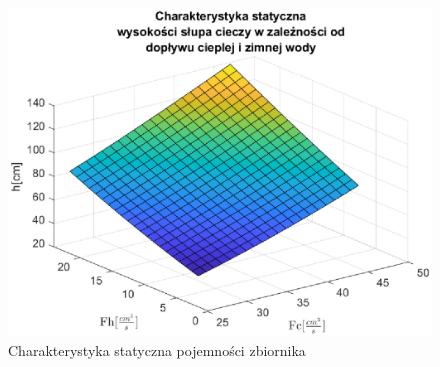 \begin{figure}[h!]
   \centering
   \includegraphics{img/static/staticV.eps}
   \caption{Charakterystyka statyczna pojemności zbiornika}
   \label{fig:staticV}
\end{figure}
            

